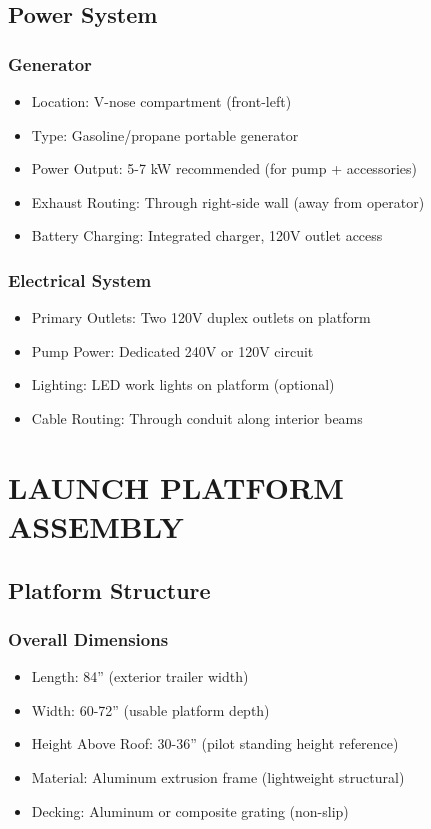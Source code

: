 \documentclass[11pt,letter]{article}
\begin{document}
\subsection{Power System}

\subsubsection{Generator}
\begin{itemize}
  \item Location: V-nose compartment (front-left)
  \item Type: Gasoline/propane portable generator
  \item Power Output: 5-7 kW recommended (for pump + accessories)
  \item Exhaust Routing: Through right-side wall (away from operator)
  \item Battery Charging: Integrated charger, 120V outlet access
\end{itemize}

\subsubsection{Electrical System}
\begin{itemize}
  \item Primary Outlets: Two 120V duplex outlets on platform
  \item Pump Power: Dedicated 240V or 120V circuit
  \item Lighting: LED work lights on platform (optional)
  \item Cable Routing: Through conduit along interior beams
\end{itemize}

\section{LAUNCH PLATFORM ASSEMBLY}

\subsection{Platform Structure}

\subsubsection{Overall Dimensions}
\begin{itemize}
  \item Length: 84'' (exterior trailer width)
  \item Width: 60-72'' (usable platform depth)
  \item Height Above Roof: 30-36'' (pilot standing height reference)
  \item Material: Aluminum extrusion frame (lightweight structural)
  \item Decking: Aluminum or composite grating (non-slip)
\end{itemize}
\end{document}

